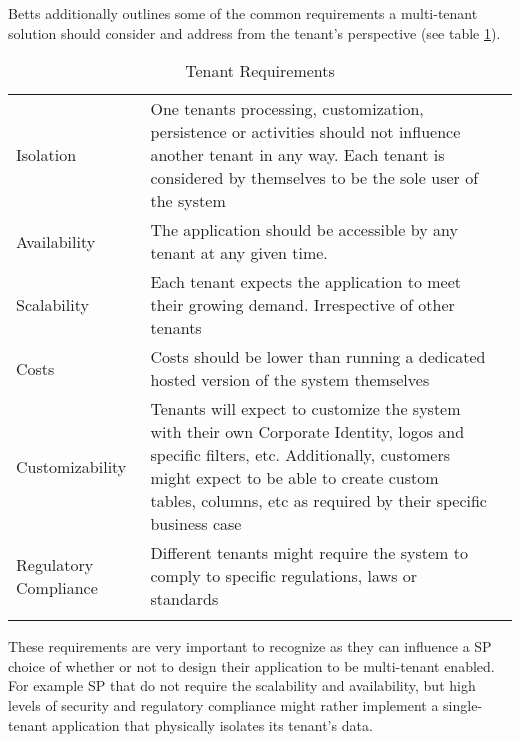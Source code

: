 Betts \cite{Betts2012-ad} additionally outlines some of the common requirements a multi-tenant solution should consider and address from the tenant's perspective (see table \ref{table:tenant-requirements}).

\begin{table}[H]
\centering
\begin{tabularx}{\textwidth}{l X l}
\cline{1-2}
\multicolumn{1}{|l|}{\cellcolor[HTML]{EFEFEF}Isolation} & \multicolumn{1}{X|}{One tenants processing, customization, persistence or activities should not influence another tenant in any way. Each tenant is considered by themselves to be the sole user of the system} &  \\ \cline{1-2}
\multicolumn{1}{|l|}{\cellcolor[HTML]{EFEFEF}Availability} & \multicolumn{1}{X|}{The application should be accessible by any tenant at any given time.} &  \\ \cline{1-2}
\multicolumn{1}{|l|}{\cellcolor[HTML]{EFEFEF}Scalability} & \multicolumn{1}{X|}{Each tenant expects the application to meet their growing demand. Irrespective of other tenants} &  \\ \cline{1-2}
\multicolumn{1}{|l|}{\cellcolor[HTML]{EFEFEF}Costs} & \multicolumn{1}{X|}{Costs should be lower than running a dedicated hosted version of the system themselves} &  \\ \cline{1-2}
\multicolumn{1}{|l|}{\cellcolor[HTML]{EFEFEF}Customizability} & \multicolumn{1}{X|}{Tenants will expect to customize the system with their own Corporate Identity, logos and specific filters, etc. Additionally, customers might expect to be able to create custom tables, columns, etc as required by their specific business case} &  \\ \cline{1-2}
\multicolumn{1}{|l|}{\cellcolor[HTML]{EFEFEF}Regulatory Compliance} & \multicolumn{1}{X|}{Different tenants might require the system to comply to specific regulations, laws or standards} &  \\ \cline{1-2}
 &  & 
\end{tabularx}
\caption{Tenant Requirements}
\label{table:tenant-requirements}
\end{table}

These requirements are very important to recognize as they can influence a SP choice of whether or not to design their application to be multi-tenant enabled. For example SP that do not require the scalability and availability, but high levels of security and regulatory compliance might rather implement a single-tenant application that physically isolates its tenant's data.


